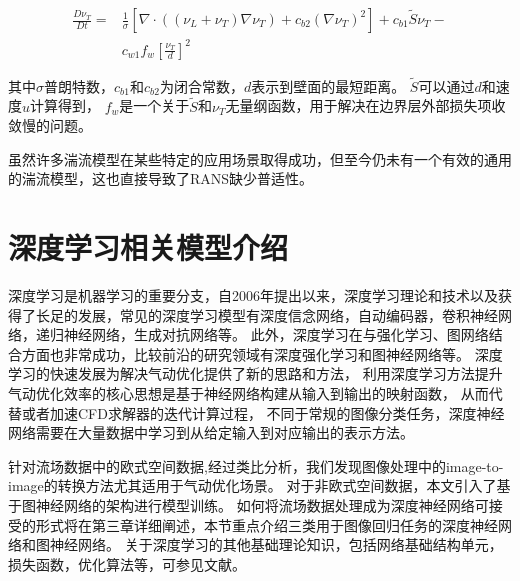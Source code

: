 \begin{equation}\label{SA_equo}
\begin{split}
\frac{D \nu_{T}}{D t}=& \frac{1}{\sigma}\left[\nabla \cdot((\nu_{L}+\nu_{T}) \nabla \nu_{T})+c_{b 2}(\nabla \nu_{T})^{2}\right] +c_{b 1} \tilde{S} \nu_{T} - \\ &c_{w 1} f_{w}\left[\frac{\nu_{T}}{d}\right]^{2}
\end{split}
\end{equation}

\noindent 其中$\sigma$普朗特数，$c_{b 1}$和$c_{b 2}$为闭合常数，$d$表示到壁面的最短距离。
$\tilde{S}$可以通过$d$和速度$u$计算得到，
$f_{w}$是一个关于$\tilde{S}$和$\nu_{T}$无量纲函数，用于解决在边界层外部损失项收敛慢的问题。

虽然许多湍流模型在某些特定的应用场景取得成功，但至今仍未有一个有效的通用的湍流模型，这也直接导致了RANS缺少普适性。



\section{深度学习相关模型介绍}
深度学习是机器学习的重要分支，自2006年提出以来，深度学习理论和技术以及获得了长足的发展，常见的深度学习模型有深度信念网络\cite{深度信念网络}，自动编码器\cite{Bengio2013Representation}，卷积神经网络\cite{Lecun1998Gradient}，递归神经网络\cite{Williams2014A}，生成对抗网络\cite{GAN}等。
此外，深度学习在与强化学习、图网络结合方面也非常成功，比较前沿的研究领域有深度强化学习\cite{Deepreinforcementlearning}和图神经网络\cite{2016Semi}等。
深度学习的快速发展为解决气动优化提供了新的思路和方法，
利用深度学习方法提升气动优化效率的核心思想是基于神经网络构建从输入到输出的映射函数，
从而代替或者加速CFD求解器的迭代计算过程，
不同于常规的图像分类任务，深度神经网络需要在大量数据中学习到从给定输入到对应输出的表示方法。

针对流场数据中的欧式空间数据,经过类比分析，我们发现图像处理中的image-to-image\cite{DBLP:conf/miccai/RonnebergerFB15,DBLP:conf/cvpr/LongSD15,isola2017image,CycleGAN2017,DBLP:conf/cvpr/AmodioK19}的转换方法尤其适用于气动优化场景。
对于非欧式空间数据，本文引入了基于图神经网络的架构进行模型训练。
如何将流场数据处理成为深度神经网络可接受的形式将在第三章详细阐述，本节重点介绍三类用于图像回归任务的深度神经网络和图神经网络。
关于深度学习的其他基础理论知识，包括网络基础结构单元，损失函数，优化算法等，可参见文献\cite{dnnsurvey}。


